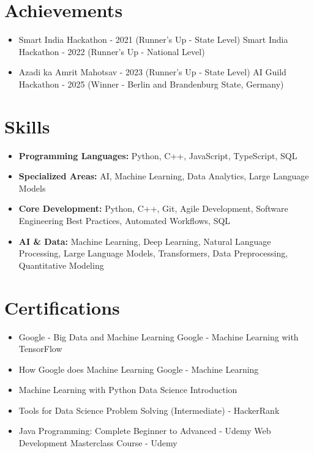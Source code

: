\documentclass[a4paper,10pt]{article}
\begin{document}
\section*{Achievements}
\begin{itemize}
\item Smart India Hackathon - 2021 (Runner's Up - State Level) \hfill Smart India Hackathon - 2022 (Runner's Up - National Level)
\item Azadi ka Amrit Mahotsav - 2023 (Runner's Up - State Level) \hfill AI Guild Hackathon - 2025 (Winner - Berlin and Brandenburg State, Germany)
\end{itemize}

\section*{Skills}
\begin{itemize}
  \item \textbf{Programming Languages:} Python, C++, JavaScript, TypeScript, SQL
  \item \textbf{Specialized Areas:} AI, Machine Learning, Data Analytics, Large Language Models
  \item \textbf{Core Development:} Python, C++, Git, Agile Development, Software Engineering Best Practices, Automated Workflows, SQL
  \item \textbf{AI \& Data:} Machine Learning, Deep Learning, Natural Language Processing, Large Language Models, Transformers, Data Preprocessing, Quantitative Modeling
\end{itemize}

\section*{Certifications}
\begin{itemize}
\item Google - Big Data and Machine Learning \hfill Google - Machine Learning with TensorFlow
\item How Google does Machine Learning \hfill Google - Machine Learning
\item Machine Learning with Python \hfill Data Science Introduction
\item Tools for Data Science \hfill Problem Solving (Intermediate) - HackerRank
\item Java Programming: Complete Beginner to Advanced - Udemy \hfill Web Development Masterclass Course - Udemy
\end{itemize}
\end{document}
